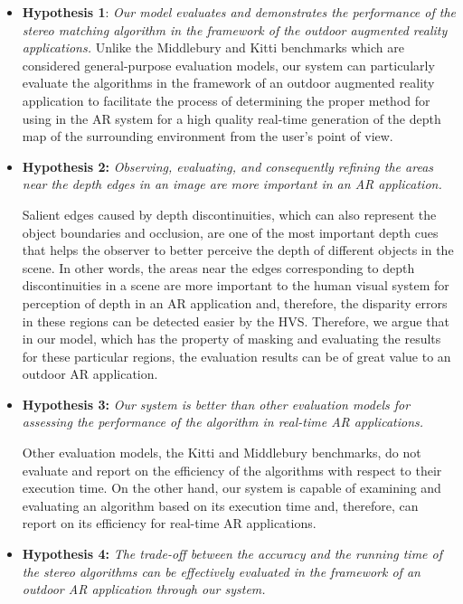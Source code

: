 \begin{itemize}
\item \textbf{Hypothesis 1}: \emph{Our model evaluates and demonstrates 
the performance of the stereo matching algorithm in the framework of 
the outdoor augmented reality applications.} 
Unlike the Middlebury and Kitti benchmarks which are considered general-purpose evaluation models, 
our system can particularly evaluate the algorithms in the framework of an 
outdoor augmented reality application to facilitate the process of determining
the proper method for using in the AR system for a high quality real-time generation of the depth map of the surrounding environment from 
the user's point of view.

\item \textbf{Hypothesis 2:} \emph{Observing, evaluating, and consequently 
refining the areas near the depth edges in an image are more important in an AR application.}

Salient edges caused by depth discontinuities, 
which can also represent the object boundaries and occlusion, are one of the 
most important depth cues that helps the observer to better perceive the depth of different objects in the scene. In other words, the areas near the edges corresponding to depth discontinuities
in a scene are more important to the human visual system for perception of depth in an AR application and, therefore, the disparity 
errors in these regions can be detected easier by the HVS. Therefore, we argue that in our model, which has the property of masking and evaluating the results for
these particular regions,
the evaluation results can be of great value to an outdoor AR application.

\item \textbf{Hypothesis 3:} \emph{Our system is better than other evaluation models for assessing the performance of the algorithm in
real-time AR applications.}

Other evaluation models, the Kitti and Middlebury benchmarks, do not evaluate and report on the efficiency of the algorithms
with respect to their execution time. On the other hand, our system is capable of examining and evaluating an algorithm 
based on its execution time and, therefore, can report on its efficiency for real-time AR applications.

\item \textbf{Hypothesis 4:} \emph{The trade-off between the accuracy and the running time of the stereo algorithms can be effectively evaluated 
in the framework of an outdoor AR application through our system.} 


\end{itemize}
